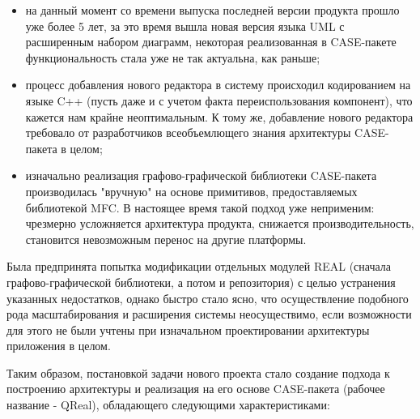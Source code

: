 \documentclass[a5paper]{article}
\begin{document}
\begin{itemize}
  \item на данный момент со времени выпуска последней версии продукта прошло уже
        более 5 лет, за это время вышла новая версия языка
        UML с расширенным набором диаграмм, некоторая реализованная в
        CASE-пакете функциональность стала уже не так актуальна, как раньше;
  \item процесс добавления нового редактора в систему происходил кодированием на
        языке C++ (пусть даже и с учетом факта
        переиспользования компонент), что кажется нам крайне неоптимальным. К
        тому же, добавление нового редактора требовало от разработчиков
        всеобъемлющего знания архитектуры CASE-пакета в целом;
  \item изначально реализация графово-графической библиотеки
        CASE-пакета производилась "вручную" на
        основе примитивов, предоставляемых библиотекой
        MFC. В настоящее время такой подход уже
        неприменим: чрезмерно усложняется архитектура продукта, снижается
        производительность, становится невозможным перенос на другие
        платформы.
\end{itemize}

Была предпринята попытка модификации отдельных модулей
REAL (сначала графово-графической библиотеки, а потом и репозитория) с целью устранения указанных
недостатков, однако быстро стало ясно, что осуществление подобного рода
масштабирования и расширения системы неосуществимо, если возможности
для этого не были учтены при изначальном проектировании архитектуры
приложения в целом.

Таким образом, постановкой задачи нового проекта стало создание подхода
к построению архитектуры и реализация на его основе
CASE-пакета (рабочее название - QReal), обладающего следующими характеристиками:
\end{document}
